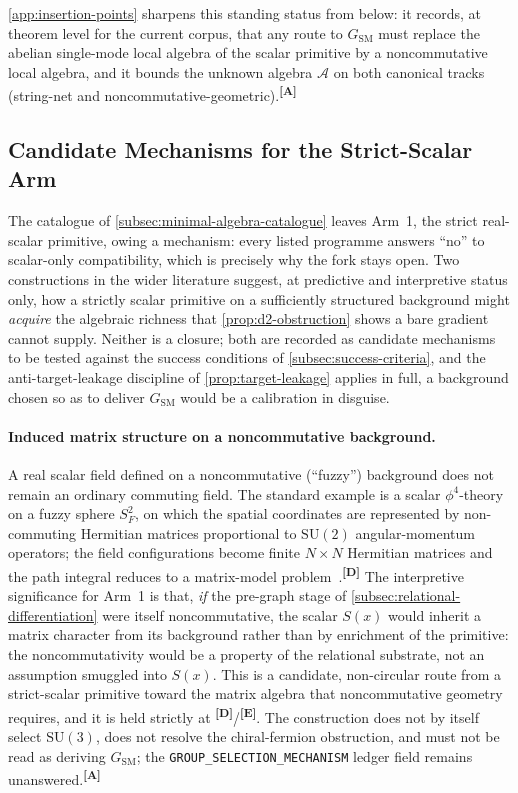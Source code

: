\documentclass[12pt,a4paper,twoside]{article}
\theoremstyle{plain}
\theoremstyle{definition}
\theoremstyle{remark}
\newcommand{\catmark}[1]{\textsuperscript{\textsf{\textbf{[#1]}}}}
\newcommand{\Sx}{S(x)}
\begin{document}
\noindent \cref{app:insertion-points} sharpens this standing status from below: it records, at theorem level for the current corpus, that any route to $G_{\mathrm{SM}}$ must replace the abelian single-mode local algebra of the scalar primitive by a noncommutative local algebra, and it bounds the unknown algebra $\mathcal{A}$ on both canonical tracks (string-net and noncommutative-geometric).\catmark{A}

\subsection{Candidate Mechanisms for the Strict-Scalar Arm}
\label{subsec:arm1-mechanisms}

The catalogue of \cref{subsec:minimal-algebra-catalogue} leaves Arm~1, the strict real-scalar primitive, owing a mechanism: every listed programme answers ``no'' to scalar-only compatibility, which is precisely why the fork stays open. Two constructions in the wider literature suggest, at predictive and interpretive status only, how a strictly scalar primitive on a sufficiently structured background might \emph{acquire} the algebraic richness that \cref{prop:d2-obstruction} shows a bare gradient cannot supply. Neither is a closure; both are recorded as candidate mechanisms to be tested against the success conditions of \cref{subsec:success-criteria}, and the anti-target-leakage discipline of \cref{prop:target-leakage} applies in full, a background chosen so as to deliver $G_{\mathrm{SM}}$ would be a calibration in disguise.

\paragraph{Induced matrix structure on a noncommutative background.}
A real scalar field defined on a noncommutative (``fuzzy'') background does not remain an ordinary commuting field. The standard example is a scalar $\phi^4$-theory on a fuzzy sphere $S_F^2$, on which the spatial coordinates are represented by non-commuting Hermitian matrices proportional to $\mathrm{SU}(2)$ angular-momentum operators; the field configurations become finite $N\times N$ Hermitian matrices and the path integral reduces to a matrix-model problem~\cite{fuzzy1012}.\catmark{D} The interpretive significance for Arm~1 is that, \emph{if} the pre-graph stage of \cref{subsec:relational-differentiation} were itself noncommutative, the scalar $\Sx$ would inherit a matrix character from its background rather than by enrichment of the primitive: the noncommutativity would be a property of the relational substrate, not an assumption smuggled into $\Sx$. This is a candidate, non-circular route from a strict-scalar primitive toward the matrix algebra that noncommutative geometry requires, and it is held strictly at \catmark{D}/\catmark{E}. The construction does not by itself select $\mathrm{SU}(3)$, does not resolve the chiral-fermion obstruction, and must not be read as deriving $G_{\mathrm{SM}}$; the \texttt{GROUP\_SELECTION\_MECHANISM} ledger field remains unanswered.\catmark{A}
\end{document}

